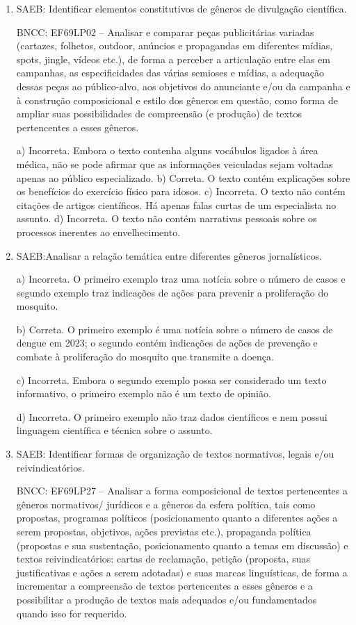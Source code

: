\begin{enumerate}

\item
SAEB: Identificar elementos constitutivos de gêneros de divulgação
científica.

BNCC: EF69LP02 -- Analisar e comparar peças publicitárias variadas
(cartazes, folhetos, outdoor, anúncios e propagandas em diferentes
mídias, spots, jingle, vídeos etc.), de forma a perceber a articulação
entre elas em campanhas, as especificidades das várias semioses e
mídias, a adequação dessas peças ao público-alvo, aos objetivos do
anunciante e/ou da campanha e à construção composicional e estilo dos
gêneros em questão, como forma de ampliar suas possibilidades de
compreensão (e produção) de textos pertencentes a esses gêneros.

a) Incorreta. Embora o texto contenha alguns vocábulos ligados à área médica, não se pode 
afirmar que as informações veiculadas sejam voltadas apenas ao público especializado.
b) Correta. O texto contém explicações sobre os benefícios do exercício físico para idosos.
c) Incorreta. O texto não contém citações de artigos científicos. Há apenas falas curtas de um
especialista no assunto.
d) Incorreta. O texto não contém narrativas pessoais sobre os processos inerentes ao envelhecimento.

\item
SAEB:Analisar a relação temática entre diferentes gêneros jornalísticos.

a) Incorreta. O primeiro exemplo traz uma notícia sobre o número de casos
e segundo exemplo traz indicações de ações para prevenir a
proliferação do mosquito.

b) Correta. O primeiro exemplo é uma
notícia sobre o número de casos de dengue em 2023; o segundo contém
indicações de ações de prevenção e combate à proliferação do
mosquito que transmite a doença.

c) Incorreta. Embora o segundo exemplo possa ser considerado um texto
informativo, o primeiro exemplo não é um texto de opinião.

d) Incorreta. O primeiro exemplo não traz dados científicos e nem possui
linguagem científica e técnica sobre o assunto.

\item
SAEB: Identificar formas de organização de textos normativos, legais
e/ou reivindicatórios.

BNCC: EF69LP27 -- Analisar a forma composicional de textos
pertencentes a gêneros normativos/ jurídicos e a gêneros da esfera
política, tais como propostas, programas políticos (posicionamento
quanto a diferentes ações a serem propostas, objetivos, ações previstas
etc.), propaganda política (propostas e sua sustentação, posicionamento
quanto a temas em discussão) e textos reivindicatórios: cartas de
reclamação, petição (proposta, suas justificativas e ações a serem
adotadas) e suas marcas linguísticas, de forma a incrementar a
compreensão de textos pertencentes a esses gêneros e a possibilitar a
produção de textos mais adequados e/ou fundamentados quando isso for
requerido.


\end{enumerate}
